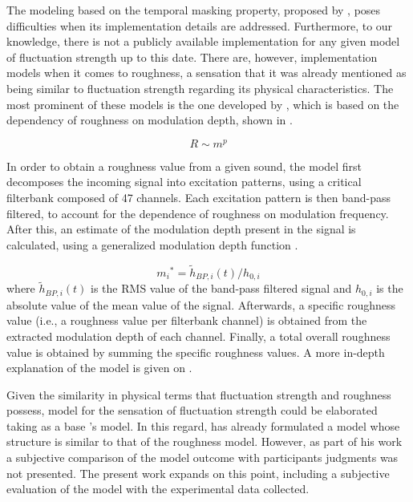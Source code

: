 \documentclass[../main.tex]{subfiles}
\begin{document}
\begin{theoreticalbackground}
The modeling based on the temporal masking property, proposed by
\citeauthor{Fastl2007Psychoacoustics}, poses difficulties when its
implementation details are addressed. Furthermore, to our knowledge, there is
not a publicly available implementation for any given model of fluctuation
strength up to this date. There are, however, implementation models when it
comes to roughness, a sensation that it was already mentioned as being similar
to fluctuation strength regarding its physical characteristics. The most
prominent of these models is the one developed by
\textcite{daniel1997psychoacoustical}, which is based on the dependency of
roughness on modulation depth, shown in .

\begin{equation}
  R \sim m^p
  \label{eq:R}
\end{equation}

In order to obtain a roughness value from a given sound, the model first
decomposes the incoming signal into excitation patterns, using a critical
filterbank composed of 47 channels. Each excitation pattern is then band-pass
filtered, to account for the dependence of roughness on modulation frequency.
After this, an estimate of the modulation depth present in the signal is
calculated, using a generalized modulation depth function .

\begin{equation}
  {m_i}^* = \tilde{h}_{BP,i}(t)/h_{0,i}
  \label{eq:genmod}
\end{equation}
where $\tilde{h}_{BP,i}(t)$ is the \gls{RMS} value of the band-pass filtered
signal and $h_{0,i}$ is the absolute value of the mean value of the signal.
Afterwards, a specific roughness value (i.e., a roughness value per filterbank
channel) is obtained from the extracted modulation depth of each channel.
Finally, a total overall roughness value is obtained by summing the specific
roughness values. A more in-depth explanation of the model is given on
.

Given the similarity in physical terms that fluctuation strength and roughness
possess,  model for the sensation of fluctuation strength could be elaborated
taking as a base \citeauthor{daniel1997psychoacoustical}'s model. In this
regard, \textcite{Sontacchi1998} has already formulated a model whose structure
is similar to that of the roughness model. However, as part of his work a
subjective comparison of the model outcome with participants judgments was not
presented. The present work expands on this point, including a subjective
evaluation of the model with the experimental data collected.


\end{theoreticalbackground}
\end{document}
